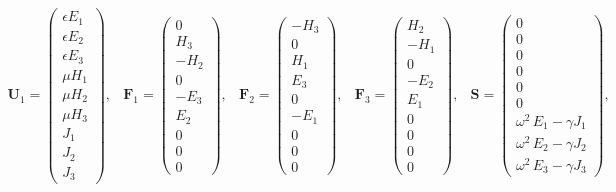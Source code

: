 \documentclass[times,11pt]{ACME2015article}
\newcommand{\mb}{\mathbf}
\begin{document}
\begin{equation*}
\begin{array}{ccccc}
\mb{U}_1 = \begin{pmatrix} \epsilon E_1 \\ \epsilon E_2 \\ \epsilon E_3 \\ \mu H_1 \\ \mu H_2 \\  \mu H_3 \\ J_1 \\  J_2 \\ J_3 \end{pmatrix} ,
&
\mb{F}_1 = \begin{pmatrix} 0 \\ H_3 \\ -H_2 \\ 0 \\ -E_3 \\ E_2 \\ 0 \\  0 \\ 0 \end{pmatrix} ,
&
\mb{F}_2 = \begin{pmatrix} - H_3 \\ 0 \\ H_1 \\ E_3 \\ 0 \\ -E_1 \\ 0 \\  0 \\ 0 \end{pmatrix} ,
&
\mb{F}_3 = \begin{pmatrix} H_2 \\ -H_1 \\ 0 \\ -E_2 \\ E_1 \\ 0 \\ 0 \\  0 \\ 0 \end{pmatrix} ,
&
\mb{S} = \begin{pmatrix} 0 \\ 0 \\ 0 \\ 0 \\ 0 \\ 0 \\ \omega^2 \, E_1 - \gamma J_1 \\  \omega^2 \, E_2 - \gamma J_2 \\ \omega^2 \, E_3 - \gamma J_3 \end{pmatrix} ,
\end{array}
\:
\end{equation*}
\end{document}
